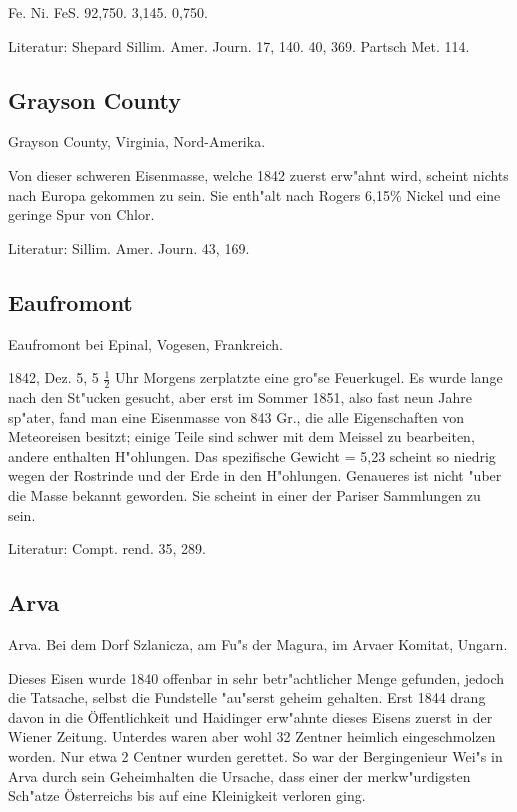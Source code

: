 \documentclass[a4paper, 11pt, oneside]{article}
\begin{document}
Fe. Ni. FeS.  
92,750. 3,145. 0,750.

Literatur: Shepard Sillim. Amer. Journ. 17, 140. 40, 369. Partsch Met. 114.

\subsection{Grayson County}

Grayson County, Virginia, Nord-Amerika.

Von dieser schweren Eisenmasse, welche 1842 zuerst erw"ahnt wird, scheint nichts nach Europa gekommen zu sein. Sie enth"alt nach Rogers 6,15\% Nickel und eine geringe Spur von Chlor.

Literatur: Sillim. Amer. Journ. 43, 169.

\subsection{Eaufromont}

Eaufromont bei Epinal, Vogesen, Frankreich.

1842, Dez. 5, 5 $\frac{1}{2}$ Uhr Morgens zerplatzte eine gro"se Feuerkugel. Es wurde lange nach den St"ucken gesucht, aber erst im Sommer 1851, also fast neun Jahre sp"ater, fand man eine Eisenmasse von 843 Gr., die alle Eigenschaften von Meteoreisen besitzt; einige Teile sind schwer mit dem Meissel zu bearbeiten, andere enthalten H"ohlungen. Das spezifische Gewicht = 5,23 scheint so niedrig wegen der Rostrinde und der Erde in den H"ohlungen. Genaueres ist nicht "uber die Masse bekannt geworden. Sie scheint in einer der Pariser Sammlungen zu sein.

Literatur: Compt. rend. 35, 289.

\subsection{Arva}

Arva. Bei dem Dorf Szlanicza, am Fu"s der Magura, im Arvaer Komitat, Ungarn.

Dieses Eisen wurde 1840 offenbar in sehr betr"achtlicher Menge gefunden, jedoch die Tatsache, selbst die Fundstelle "au"serst geheim gehalten. Erst 1844 drang davon in die Öffentlichkeit und Haidinger erw"ahnte dieses Eisens zuerst in der Wiener Zeitung. Unterdes waren aber wohl 32 Zentner heimlich eingeschmolzen worden. Nur etwa 2 Centner wurden gerettet. So war der Bergingenieur Wei"s in Arva durch sein Geheimhalten die Ursache, dass einer der merkw"urdigsten Sch"atze Österreichs bis auf eine Kleinigkeit verloren ging.
\end{document}
